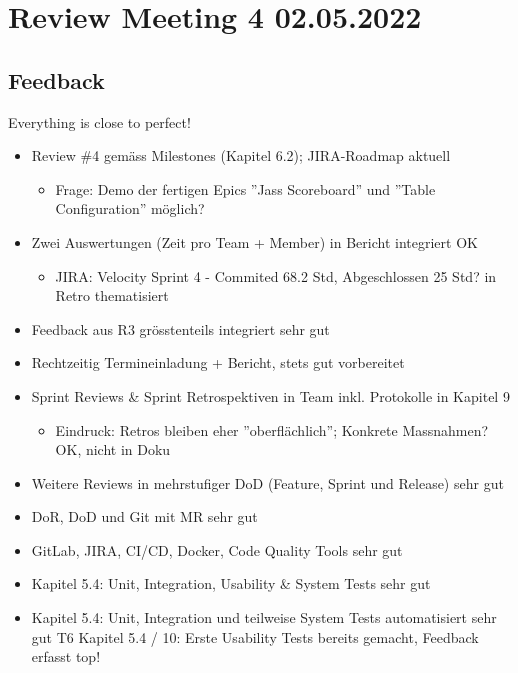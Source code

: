 \section{Review Meeting 4 02.05.2022}

\subsection{Feedback}
Everything is close to perfect!

\begin{itemize}
    \item Review \#4 gemäss Milestones (Kapitel 6.2); JIRA-Roadmap aktuell
    \begin{itemize}
        \item Frage: Demo der fertigen Epics ''Jass Scoreboard'' und ''Table Configuration'' möglich?
    \end{itemize}
    \item Zwei Auswertungen (Zeit pro Team + Member) in Bericht integriert \textrightarrow OK
    \begin{itemize}
        \item JIRA: Velocity Sprint 4 - Commited 68.2 Std, Abgeschlossen 25 Std? \textrightarrow in Retro thematisiert
    \end{itemize}
    \item Feedback aus R3 grösstenteils integriert \textrightarrow sehr gut
    \item Rechtzeitig Termineinladung + Bericht, stets gut vorbereitet
    \item Sprint Reviews \& Sprint Retrospektiven in Team inkl. Protokolle in Kapitel 9
    \begin{itemize}
        \item Eindruck: Retros bleiben eher ''oberflächlich''; Konkrete Massnahmen? \textrightarrow OK, nicht in Doku
    \end{itemize}
    \item Weitere Reviews in mehrstufiger DoD (Feature, Sprint und Release) \textrightarrow sehr gut
    \item DoR, DoD und Git mit MR \textrightarrow sehr gut
    \item GitLab, JIRA, CI/CD, Docker, Code Quality Tools \textrightarrow sehr gut
    \item Kapitel 5.4: Unit, Integration, Usability \& System Tests \textrightarrow sehr gut
    \item Kapitel 5.4: Unit, Integration und teilweise System Tests automatisiert \textrightarrow sehr gut T6 Kapitel 5.4 / 10: Erste Usability Tests bereits gemacht, Feedback erfasst \textrightarrow top!

\end{itemize}
